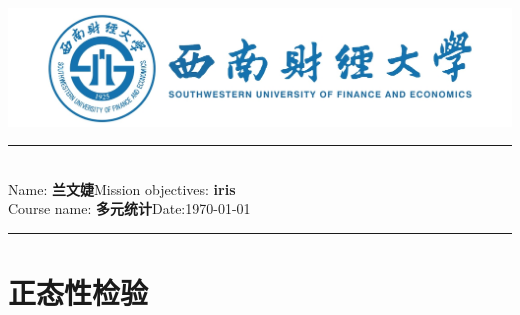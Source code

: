 \documentclass[11pt,a4paper]{article}\usepackage[]{graphicx}\usepackage[]{color}
\newcommand{\student}{\textbf{兰文婕}}
\newcommand{\course}{\textbf{多元统计}}
\newcommand{\assignment}{\textbf{iris}}
\begin{document}
	\thispagestyle{empty}
	\begin{center}
		\includegraphics[scale = 1]{Figure/1.jpg}
		\vspace{0.1cm}
	\end{center}
	\noindent
	\rule{17cm}{0.2cm}\\[0.3cm]
	Name: \student \hfill Mission objectives: \assignment\\[0.1cm]
	Course name: \course \hfill Date:\today\\
	\rule{17cm}{0.05cm}
	\vspace{0.1cm}
	
	
	
	\section{正态性检验}
\end{document}
